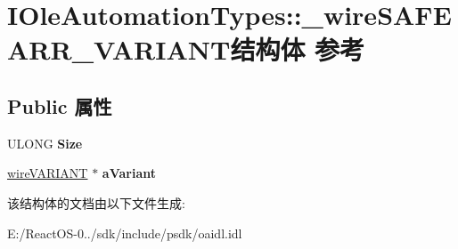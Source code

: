 \hypertarget{struct_i_ole_automation_types_1_1__wire_s_a_f_e_a_r_r___v_a_r_i_a_n_t}{}\section{I\+Ole\+Automation\+Types\+:\+:\+\_\+wire\+S\+A\+F\+E\+A\+R\+R\+\_\+\+V\+A\+R\+I\+A\+N\+T结构体 参考}
\label{struct_i_ole_automation_types_1_1__wire_s_a_f_e_a_r_r___v_a_r_i_a_n_t}
\subsection*{Public 属性}
\begin{DoxyCompactItemize}
\item 
\mbox{\label{struct_i_ole_automation_types_1_1__wire_s_a_f_e_a_r_r___v_a_r_i_a_n_t_ad187536db59ec1cd94c7adc5dc2e0f0e}} 
U\+L\+O\+NG {\bfseries Size}
\item 
\mbox{\label{struct_i_ole_automation_types_1_1__wire_s_a_f_e_a_r_r___v_a_r_i_a_n_t_a91e792cc172896b9d44e1adc0ba85f49}} 
\hyperlink{struct_i_ole_automation_types_1_1__wire_v_a_r_i_a_n_t}{wire\+V\+A\+R\+I\+A\+NT} $\ast$ {\bfseries a\+Variant}
\end{DoxyCompactItemize}


该结构体的文档由以下文件生成\+:\begin{DoxyCompactItemize}
\item 
E\+:/\+React\+O\+S-\/0../sdk/include/psdk/oaidl.\+idl\end{DoxyCompactItemize}
